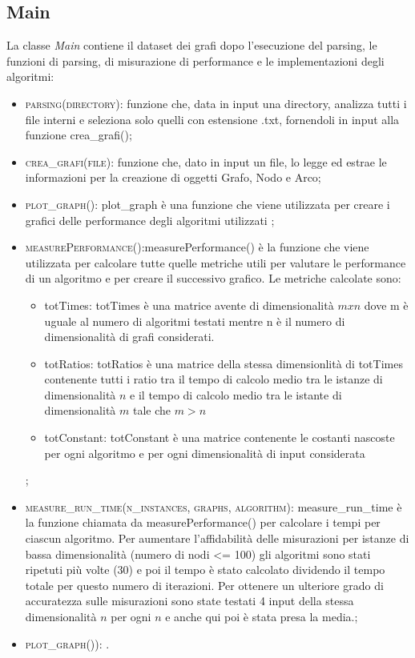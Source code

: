 \newpage

\subsection{Main}
\label{Main}

La classe \textit{Main} contiene il dataset dei grafi dopo l'esecuzione del parsing, le funzioni di parsing, di misurazione di performance e le implementazioni degli algoritmi:

\begin{itemize}
    \item \textsc{parsing(directory)}: funzione che, data in input una directory, analizza tutti i file interni e seleziona solo quelli con estensione .txt, fornendoli in input alla funzione crea\_grafi();
    \item \textsc{crea\_grafi(file)}: funzione che, dato in input un file, lo legge ed estrae le informazioni per la creazione di oggetti Grafo, Nodo e Arco;
    \item \textsc{plot\_graph()}: plot\_graph è una funzione che viene utilizzata per creare i grafici delle performance degli algoritmi utilizzati ;
    
    \item \textsc{measurePerformance()}:measurePerformance() è la funzione che viene utilizzata per calcolare tutte quelle metriche utili per valutare le performance di un algoritmo e per creare il successivo grafico. Le metriche calcolate sono:
    \begin{itemize}
        \item  totTimes:  totTimes è una matrice avente di dimensionalità $mxn$ dove m è uguale al numero di algoritmi testati mentre n è il numero di dimensionalità di grafi considerati.
        \item totRatios: totRatios è una matrice della stessa dimensionlità di totTimes contenente tutti i ratio tra il tempo di calcolo medio tra le istanze di dimensionalità $n$ e il tempo di calcolo medio tra le istante di dimensionalità $m$ tale che $m>n$
        \item  totConstant:  totConstant è una matrice contenente le costanti nascoste per ogni algoritmo e per ogni dimensionalità di input considerata
    \end{itemize};
    \item \textsc{measure\_run\_time(n\_instances, graphs, algorithm)}: measure\_run\_time è la funzione chiamata da  measurePerformance() per calcolare i tempi per ciascun algoritmo. Per aumentare l'affidabilità delle misurazioni per istanze di bassa dimensionalità (numero di nodi <= 100) gli algoritmi sono stati ripetuti più volte (30) e poi il tempo è stato calcolato dividendo il tempo totale per questo numero di iterazioni. Per ottenere un ulteriore grado di accuratezza sulle misurazioni sono state testati 4 input della stessa dimensionalità $n$ per ogni $n$ e anche qui poi è stata presa la media.;
    
    \item \textsc{plot\_graph())}: .
\end{itemize}


\newpage